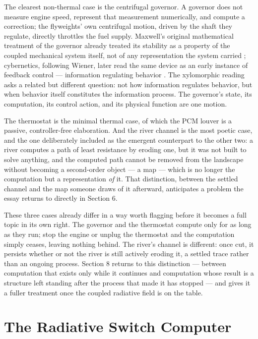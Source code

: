 \documentclass[11pt]{article}
\begin{document}
The clearest non-thermal case is the centrifugal governor. A governor does not measure engine speed, represent that measurement numerically, and compute a correction; the flyweights' own centrifugal motion, driven by the shaft they regulate, directly throttles the fuel supply. Maxwell's original mathematical treatment of the governor already treated its stability as a property of the coupled mechanical system itself, not of any representation the system carried \cite{maxwell1868}; cybernetics, following Wiener, later read the same device as an early instance of feedback control --- information regulating behavior \cite{wiener1948}. The xylomorphic reading asks a related but different question: not how information regulates behavior, but when behavior itself constitutes the information process. The governor's state, its computation, its control action, and its physical function are one motion.

The thermostat is the minimal thermal case, of which the PCM louver is a passive, controller-free elaboration. And the river channel is the most poetic case, and the one deliberately included as the emergent counterpart to the other two: a river computes a path of least resistance by eroding one, but it was not built to solve anything, and the computed path cannot be removed from the landscape without becoming a second-order object --- a map --- which is no longer the computation but a representation \emph{of} it. That distinction, between the settled channel and the map someone draws of it afterward, anticipates a problem the essay returns to directly in Section 6.

These three cases already differ in a way worth flagging before it becomes a full topic in its own right. The governor and the thermostat compute only for as long as they run; stop the engine or unplug the thermostat and the computation simply ceases, leaving nothing behind. The river's channel is different: once cut, it persists whether or not the river is still actively eroding it, a settled trace rather than an ongoing process. Section 8 returns to this distinction --- between computation that exists only while it continues and computation whose result is a structure left standing after the process that made it has stopped --- and gives it a fuller treatment once the coupled radiative field is on the table.

\section{The Radiative Switch Computer}
\end{document}
